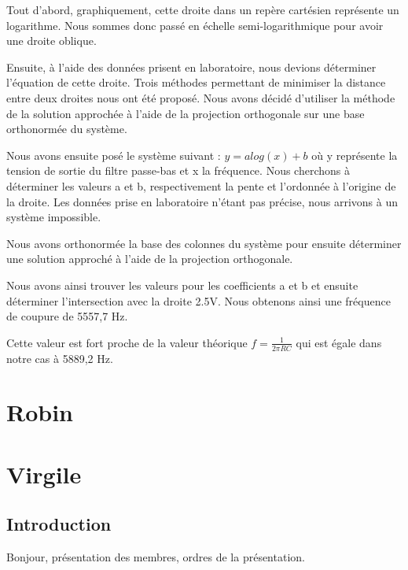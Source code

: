 \documentclass{article}
\begin{document}
Tout d'abord, graphiquement, cette droite dans un repère cartésien représente un logarithme. Nous sommes donc passé en échelle semi-logarithmique pour avoir une droite oblique.

Ensuite, à l'aide des données prisent en laboratoire, nous devions déterminer l'équation de cette droite. Trois méthodes permettant de minimiser la distance entre deux droites nous ont été proposé. Nous avons décidé d'utiliser
la méthode de la solution approchée à l'aide de la projection orthogonale sur une base orthonormée du système. 

Nous avons ensuite posé le système suivant : $y = a log(x) + b$ où y représente la tension de sortie du filtre passe-bas et x la fréquence. Nous cherchons à déterminer les valeurs a et b, 
respectivement la pente et l'ordonnée à l'origine de la droite. Les données prise en laboratoire n'étant pas précise, nous arrivons à un système impossible. 

Nous avons orthonormée la base des colonnes du système pour ensuite  déterminer une solution approché à l'aide de la projection orthogonale. 

Nous avons ainsi trouver les valeurs pour les coefficients a et b et ensuite déterminer l'intersection avec la droite 2.5V.
Nous obtenons ainsi une fréquence de coupure de 5557,7 Hz. 

Cette valeur est fort proche de la valeur théorique $f = \frac{1}{2\pi RC}$ qui est égale dans notre cas à 5889,2 Hz.

\section{Robin}

\section{Virgile}
\subsection{Introduction}
Bonjour, présentation des membres, ordres de la présentation.
\end{document}
